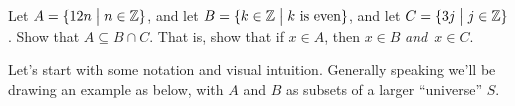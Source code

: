 \documentclass[12pt,letterpaper]{article}
\begin{document}
\thispagestyle{fancy}

\begin{enumerate}
  \Problem Let $A = \{12 n \;\big{|}\; n \in \mathbb{Z}\}$, and let $B =
  \{k\in \mathbb{Z}\;\big{|}\; k\ \text{is even}\}$, and let $C= \{3j
  \;\big{|}\; j \in \mathbb{Z}\}$.  Show that $A \subseteq B\cap C$.  That is,
  show that if $x\in A$, then $x\in B$ \emph{and}\ $x\in C$.
  \vfill

\end{enumerate}

\newpage

Let's start with some notation and
visual intuition.  Generally speaking we'll be drawing an example as
below, with $A$ and $B$ as subsets of a larger ``universe'' $S$.
\begin{center}
\end{center}
\end{document}
